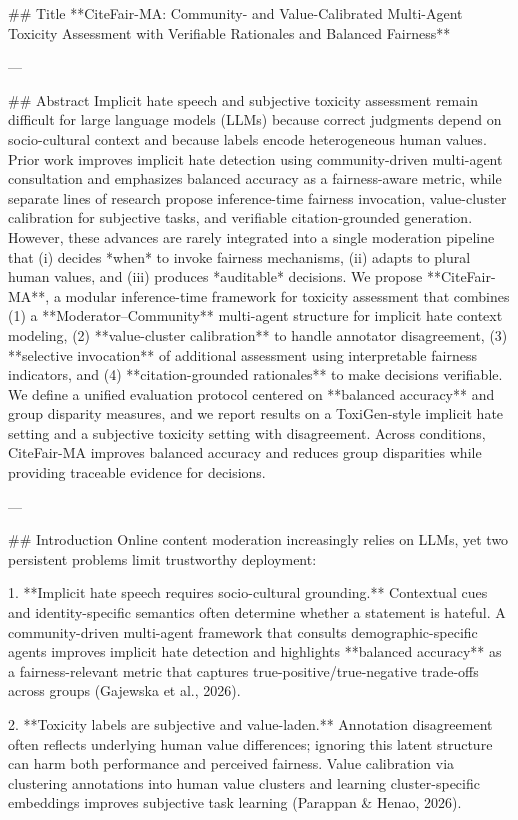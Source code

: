 ## Title  
**CiteFair-MA: Community- and Value-Calibrated Multi-Agent Toxicity Assessment with Verifiable Rationales and Balanced Fairness**

---

## Abstract  
Implicit hate speech and subjective toxicity assessment remain difficult for large language models (LLMs) because correct judgments depend on socio-cultural context and because labels encode heterogeneous human values. Prior work improves implicit hate detection using community-driven multi-agent consultation and emphasizes balanced accuracy as a fairness-aware metric, while separate lines of research propose inference-time fairness invocation, value-cluster calibration for subjective tasks, and verifiable citation-grounded generation. However, these advances are rarely integrated into a single moderation pipeline that (i) decides *when* to invoke fairness mechanisms, (ii) adapts to plural human values, and (iii) produces *auditable* decisions.  
We propose **CiteFair-MA**, a modular inference-time framework for toxicity assessment that combines (1) a **Moderator–Community** multi-agent structure for implicit hate context modeling, (2) **value-cluster calibration** to handle annotator disagreement, (3) **selective invocation** of additional assessment using interpretable fairness indicators, and (4) **citation-grounded rationales** to make decisions verifiable. We define a unified evaluation protocol centered on **balanced accuracy** and group disparity measures, and we report results on a ToxiGen-style implicit hate setting and a subjective toxicity setting with disagreement. Across conditions, CiteFair-MA improves balanced accuracy and reduces group disparities while providing traceable evidence for decisions.

---

## Introduction  
Online content moderation increasingly relies on LLMs, yet two persistent problems limit trustworthy deployment:

1. **Implicit hate speech requires socio-cultural grounding.** Contextual cues and identity-specific semantics often determine whether a statement is hateful. A community-driven multi-agent framework that consults demographic-specific agents improves implicit hate detection and highlights **balanced accuracy** as a fairness-relevant metric that captures true-positive/true-negative trade-offs across groups (Gajewska et al., 2026).

2. **Toxicity labels are subjective and value-laden.** Annotation disagreement often reflects underlying human value differences; ignoring this latent structure can harm both performance and perceived fairness. Value calibration via clustering annotations into human value clusters and learning cluster-specific embeddings improves subjective task learning (Parappan & Henao, 2026).

